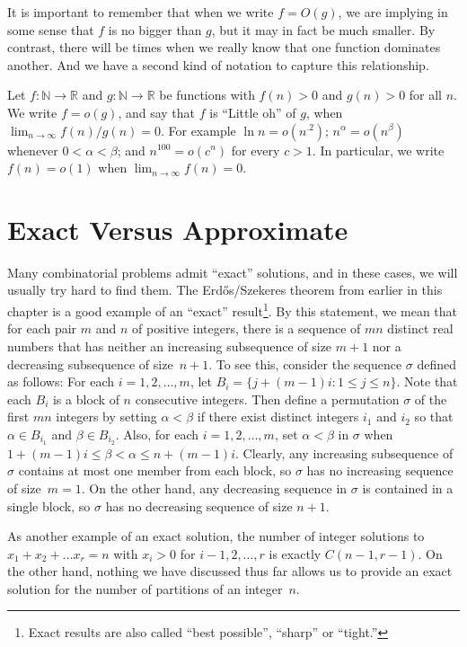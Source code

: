 It is important to remember that when we write $f=O(g)$, we are
implying in some sense that $f$ is no bigger than $g$, but it
may in fact be much smaller.  By contrast, there will be times
when we really know that one function dominates
another.  And we have a second kind of notation to capture this
relationship.

Let $f:\mathbb{N}\longrightarrow \mathbb{R}$ and
$g:\mathbb{N}\longrightarrow\mathbb{R}$ be functions with
$f(n)>0$ and $g(n)>0$ for all $n$.  We write $f=o(g)$, and 
say that $f$ is ``Little oh'' of $g$, when 
$\lim_{n\rightarrow\infty}f(n)/g(n)=0$. 
For example $\ln n=o(n^{.2})$; $n^\alpha=o(n^{\beta})$ whenever
$0<\alpha<\beta$; and $n^{100}=o(c^n)$ for every $c>1$.
In particular, we write $f(n)=o(1)$ when $\lim_{n\rightarrow\infty}f(n)=0$.

\section{Exact Versus Approximate}

Many combinatorial problems admit ``exact'' solutions, and in these
cases, we will usually try hard to find them.  The Erd\H{o}s/Szekeres
theorem from earlier in this chapter is a good example of an
``exact'' result\footnote{Exact results are also called ``best possible'', ``sharp'' 
or ``tight.''}.  By this statement,
we mean that for each pair $m$ and $n$ of positive integers, there
is a sequence of $mn$ distinct real numbers that has neither
an increasing subsequence of size $m+1$ nor a decreasing subsequence
of size~$n+1$.  To see this, consider the sequence $\sigma$ defined
as follows: For each $i=1,2,\dots,m$,
let $B_i=\{j+(m-1)i:1\le j\le n\}$.  Note that each $B_i$ is a block
of $n$ consecutive integers.  Then define a permutation $\sigma$ of
the first $mn$ integers by setting $\alpha<\beta$ if there exist
distinct integers $i_1$ and $i_2$ so that $\alpha\in B_{i_1}$ and
$\beta\in B_{i_2}$.  Also, for each $i=1,2,\dots,m$, set $\alpha<\beta$
in $\sigma$ when $1+(m-1)i\le \beta<\alpha\le n+(m-1)i$.  Clearly,
any increasing subsequence of $\sigma$ contains at most one member
from each block, so $\sigma$ has no increasing sequence of size~$m=1$.
On the other hand, any decreasing sequence in $\sigma$ is contained
in a single block, so $\sigma$ has no decreasing sequence of size $n+1$.

As another example of an exact solution, the number of integer solutions 
to $x_1+x_2+\dots x_r=n$ with $x_i>0$ for $i-1,2,\dots,r$ is exactly $C(n-1,r-1)$.
On the other hand, nothing we have discussed thus far allows us to provide
an exact solution for the number of partitions of an integer~$n$.

